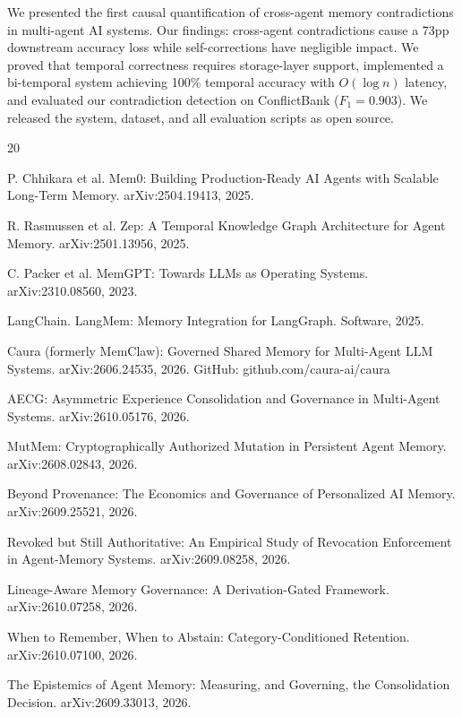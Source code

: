 \documentclass[sigconf]{acmart}
\begin{document}
We presented the first causal quantification of cross-agent memory contradictions in multi-agent AI systems. Our findings: cross-agent contradictions cause a 73pp downstream accuracy loss while self-corrections have negligible impact. We proved that temporal correctness requires storage-layer support, implemented a bi-temporal system achieving 100\% temporal accuracy with $O(\log n)$ latency, and evaluated our contradiction detection on ConflictBank ($F_1 = 0.903$). We released the system, dataset, and all evaluation scripts as open source.



\begin{thebibliography}{20}

 P. Chhikara et al. Mem0: Building Production-Ready AI Agents with Scalable Long-Term Memory. arXiv:2504.19413, 2025.

 R. Rasmussen et al. Zep: A Temporal Knowledge Graph Architecture for Agent Memory. arXiv:2501.13956, 2025.

 C. Packer et al. MemGPT: Towards LLMs as Operating Systems. arXiv:2310.08560, 2023.

 LangChain. LangMem: Memory Integration for LangGraph. Software, 2025.

 Caura (formerly MemClaw): Governed Shared Memory for Multi-Agent LLM Systems. arXiv:2606.24535, 2026. GitHub: github.com/caura-ai/caura

 AECG: Asymmetric Experience Consolidation and Governance in Multi-Agent Systems. arXiv:2610.05176, 2026.

 MutMem: Cryptographically Authorized Mutation in Persistent Agent Memory. arXiv:2608.02843, 2026.

 Beyond Provenance: The Economics and Governance of Personalized AI Memory. arXiv:2609.25521, 2026.

 Revoked but Still Authoritative: An Empirical Study of Revocation Enforcement in Agent-Memory Systems. arXiv:2609.08258, 2026.

 Lineage-Aware Memory Governance: A Derivation-Gated Framework. arXiv:2610.07258, 2026.

 When to Remember, When to Abstain: Category-Conditioned Retention. arXiv:2610.07100, 2026.

 The Epistemics of Agent Memory: Measuring, and Governing, the Consolidation Decision. arXiv:2609.33013, 2026.


\end{thebibliography}
\end{document}
